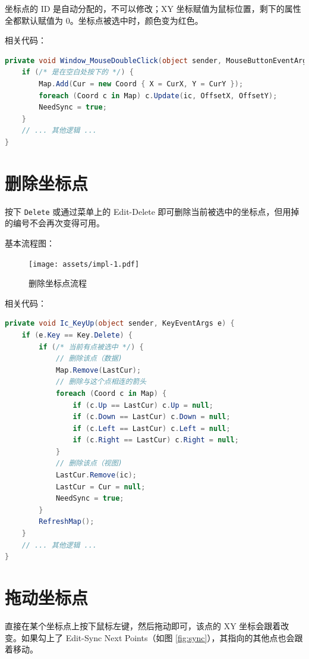 坐标点的 ID 是自动分配的，不可以修改；XY 坐标赋值为鼠标位置，剩下的属性全都默认赋值为 0。坐标点被选中时，颜色变为红色。

相关代码：

\begin{lstlisting}[language=cs]
private void Window_MouseDoubleClick(object sender, MouseButtonEventArgs e) {
    if (/* 是在空白处按下的 */) {
        Map.Add(Cur = new Coord { X = CurX, Y = CurY });
        foreach (Coord c in Map) c.Update(ic, OffsetX, OffsetY);
        NeedSync = true;
    }
    // ... 其他逻辑 ...
}
\end{lstlisting}

\section{删除坐标点}

按下 \texttt{Delete} 或通过菜单上的 Edit-Delete 即可删除当前被选中的坐标点，但用掉的编号不会再次变得可用。

基本流程图：

\begin{figure}[H]
    \centering
    \texttt{[image: assets/impl-1.pdf]}
    \caption{删除坐标点流程}
    \label{fig:impl-1}
\end{figure}

相关代码：

\begin{lstlisting}[language=cs]
private void Ic_KeyUp(object sender, KeyEventArgs e) {
    if (e.Key == Key.Delete) {
        if (/* 当前有点被选中 */) {
            // 删除该点（数据)
            Map.Remove(LastCur);
            // 删除与这个点相连的箭头
            foreach (Coord c in Map) {
                if (c.Up == LastCur) c.Up = null;
                if (c.Down == LastCur) c.Down = null;
                if (c.Left == LastCur) c.Left = null;
                if (c.Right == LastCur) c.Right = null;
            }
            // 删除该点（视图)
            LastCur.Remove(ic);
            LastCur = Cur = null;
            NeedSync = true;
        }
        RefreshMap();
    }
    // ... 其他逻辑 ...
}
\end{lstlisting}

\section{拖动坐标点}

直接在某个坐标点上按下鼠标左键，然后拖动即可，该点的 XY 坐标会跟着改变。如果勾上了 Edit-Sync Next Points（如图 \ref{fig:sync}），其指向的其他点也会跟着移动。

